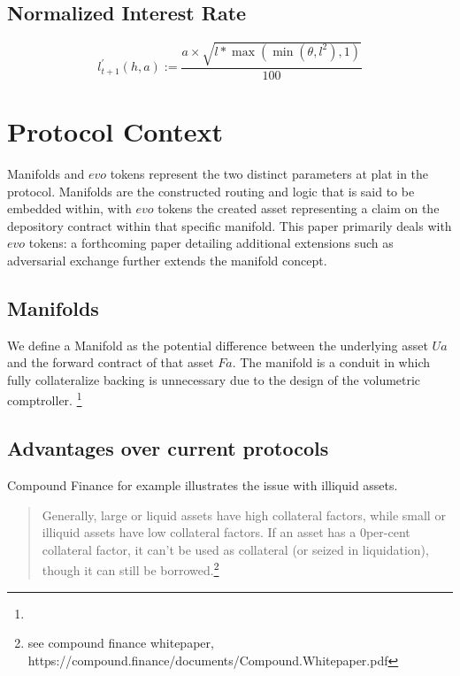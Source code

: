 \begin{tcolorbox}
	\subsection{Normalized Interest Rate}
	\label{Normalized Interest Rate }
	\begin{equation}
		l_{t+1}^{\prime}(h, a):=\frac{a \times \sqrt{l * \max \left(\min \left(\theta, l^{2}\right), 1\right)}}{100}
	\end{equation}
\end{tcolorbox}



\newpage


\section{Protocol Context}

Manifolds and $evo$ tokens represent the two distinct parameters at plat in the protocol. Manifolds are the constructed routing and logic that is said to be embedded  within, with $evo$ tokens the created asset representing a claim on the depository contract within that specific manifold. 
This paper primarily deals with $evo$ tokens: a forthcoming paper detailing additional extensions such as adversarial exchange further extends the manifold concept.


\subsection{Manifolds}
We define a Manifold as the  potential difference between the underlying asset $Ua$ and the forward contract of that asset $Fa$. The manifold is a conduit in which fully collateralize backing is unnecessary due to the design of the volumetric comptroller. \footnote{}

\subsection{Advantages over current protocols}

Compound Finance for example illustrates the issue with {illiquid assets}. 

\begin{quote}
	Generally, large or liquid assets have high collateral factors, while small or illiquid assets have low collateral factors. If an asset has a 0per-cent collateral factor, it can't be used as collateral (or seized in liquidation), though it can still be borrowed.\footnote{see compound finance whitepaper, https://compound.finance/documents/Compound.Whitepaper.pdf}
\end{quote}

